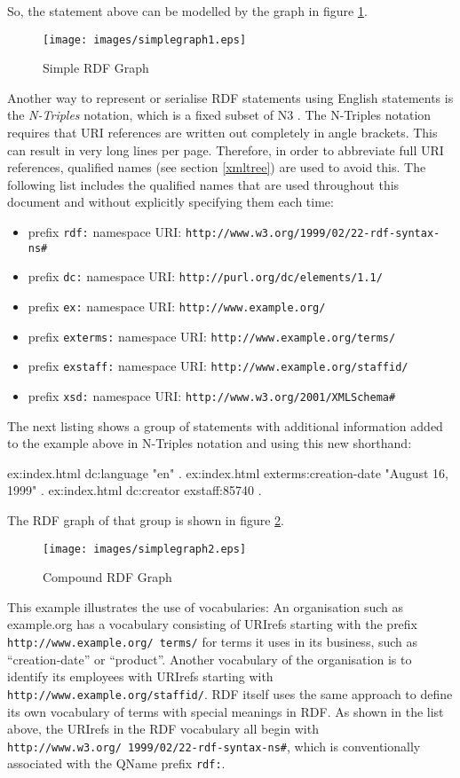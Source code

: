 \documentclass[11pt,a4paper,headsepline, bibtotoc]{scrreprt}
\begin{document}
So, the statement above can be modelled by the graph in figure \ref{graph1}.
\begin{figure}[H]
        \caption{Simple RDF Graph}
        \label{graph1}
        \texttt{[image: images/simplegraph1.eps]}
\end{figure}
Another way to represent or serialise RDF statements using English statements is the \textit{N-Triples} notation, which is a fixed subset of N3 \cite{N3}. The N-Triples notation requires that URI references are written out completely in angle brackets. This can result in very long lines per page. Therefore, in order to abbreviate full URI references, qualified names (see section \ref{xmltree}) are used to avoid this. The following list includes the qualified names that are used throughout this document and without explicitly specifying them each time:
\begin{itemize}
\item prefix \texttt{rdf:} namespace URI: \texttt{http://www.w3.org/1999/02/22-rdf-syntax-ns\#}
\item prefix \texttt{dc:} namespace URI: \texttt{http://purl.org/dc/elements/1.1/}
\item prefix \texttt{ex:} namespace URI: \texttt{http://www.example.org/}
\item prefix \texttt{exterms:} namespace URI: \texttt{http://www.example.org/terms/}
\item prefix \texttt{exstaff:} namespace URI: \texttt{http://www.example.org/staffid/}
\item prefix \texttt{xsd:} namespace URI: \texttt{http://www.w3.org/2001/XMLSchema\#}
\end{itemize}
The next listing shows a group of statements with additional information added to the example above in N-Triples notation and using this new shorthand: 
\begin{blank}[caption=Group of Statements with N-Triple Notation]
ex:index.html   dc:language             "en" .
ex:index.html   exterms:creation-date   "August 16, 1999" .
ex:index.html   dc:creator              exstaff:85740 .
\end{blank} 
The RDF graph of that group is shown in figure \ref{graph2}.
\begin{figure}[H]
        \caption{Compound RDF Graph}
        \label{graph2}
        \texttt{[image: images/simplegraph2.eps]}
\end{figure}
This example illustrates the use of vocabularies: An organisation such as example.org has a vocabulary consisting of URIrefs starting with the prefix \texttt{http://www.ex\-ample.org/\ terms/} for terms it uses in its business, such as ``creation-date'' or ``product''. Another vocabulary of the organisation is to identify its employees with URIrefs starting with \texttt{http://\-www.ex\-ample.org/staffid/}. RDF itself uses the same approach to define its own vocabulary of terms with special meanings in RDF. As shown in the list above, the URIrefs in the RDF vocabulary all begin with \texttt{http://www.w3.org/\ 1999/02/22-rdf-syntax-ns\#}, which is conventionally associated with the QName prefix \texttt{rdf:}.\\
\end{document}
